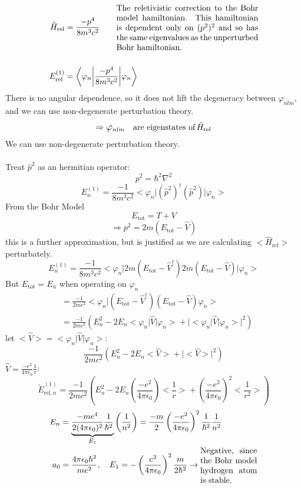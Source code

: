 \documentclass[12pt,fancychapters]{report}
\numberwithin{equation}{section}
\begin{document}
\begin{align*}
  \hat{H}_\text{rel} &= \frac{-p^4}{8m^3c^2} \quad\quad \parbox{0.5\textwidth}{The reletivistic 
  correction to the Bohr model hamiltonian. This hamiltonian is dependent only on $(p^2)^2$ 
and so has the same eigenvalues as the unperturbed Bohr hamiltonian.}\\
\\
    E^{(1)}_\text{rel} &= \bigg<\varphi_n \bigg|\frac{-p^4}{8m^3c^2}\bigg|\varphi_n\bigg>
\end{align*}
There is no angular dependence, so it does not lift the degeneracy between $\varphi_{nlm}$, and
we can use non-degenerate perturbation theory.
\[
  \Rightarrow \mathlarger{\varphi}_{nlm}\quad\text{are eigenstates of}\,\hat{H}_\text{rel}
\]
We can use non-degenerate perturbation theory.\\
\\
Treat $\hat{p}^2$ as an hermitian operator:
\[
  p^2 = \hbar^2 \nabla^2
\]
\[
  E_n^{(1)} = \frac{-1}{8m^3c^2} \big<\varphi_n\big|(\hat{p}^2)^\dagger(\hat{p}^2) \big|\varphi_n
  \big>
\]
From the Bohr Model
\[
  E_\text{tot} = T + V
\]
\[
  \Rightarrow p^2 = 2m(E_\text{tot} - \hat{V})
\]
this is a further approximation, but is justified as we are calculating $\big< 
\hat{H}_\text{rel}\big>$ perturbately.
\[
  E_n^{(1)} = \frac{-1}{8m^3c^2} \big<\varphi_n\big|2m(E_\text{tot} - \hat{V}^\dagger)2m
  (E_\text{tot} - \hat{V})\big|\varphi_n\big>
\]
But $E_\text{tot} = E_n$ when operating on $\varphi_n$
\begin{align*}
  &= \frac{-1}{2mc^2}\big<\varphi_n \big|(E_\text{tot} - \hat{V}^\dagger)
  (E_\text{tot} - \hat{V})\varphi_n\big>\\
  &= \frac{-1}{2mc^2}\left(E_n^2 - 2E_n\big<\varphi_n\big|\hat{V}\big|\varphi_n\big> + 
  \big|\big<\varphi_n\big|\hat{V}\big|\varphi_n \big>\big|^2\right)
\end{align*}
let $\big<\hat{V}\big> = \big<\varphi_n\big|\hat{V}\big|\varphi_n\big>$:
\[
 \frac{-1}{2mc^2}\left(E_n^2 - 2E_n\big<\hat{V}\big> + 
 \big|\big<\hat{V}\big>\big|^2\right) 
\]
$\hat{V} = \frac{-e^2}{4\pi\epsilon_0} \frac{1}{r}$:
\[
  \tilde{E}^{(1)}_{\text{rel},n} = \frac{-1}{2mc^2}\left(E_n^2 - 2E_n
      \left(\frac{-e^2}{4\pi\epsilon_0}\right)\bigg<\frac{1}{r}\bigg> + 
   \left(\frac{-e^2}{4\pi\epsilon_0}\right)^2\bigg<\frac{1}{r^2}\bigg>\right)
\]
\begin{align*}
  E_n &= \underbrace{\frac{-me^4}{2(4\pi\epsilon_0)^2}\frac{1}{\hbar^2}}_{E_1} \left(\frac{1}{n^2}
  \right) = \frac{-m}{2}\left(\frac{-e^2}{4\pi\epsilon_0}\right)^2\frac{1}{\hbar^2}\frac{1}{n^2}\\
    a_0 &= \frac{4\pi\epsilon_0\hbar^2}{me^2}, \quad E_1 = -\left(\frac{e^2}{4\pi\epsilon_0}\right)^2
    \frac{m}{2\hbar^2}\rightarrow \parbox{0.2\textwidth}{Negative, since the Bohr model hydrogen 
    atom is stable.}
\end{align*}
\end{document}
